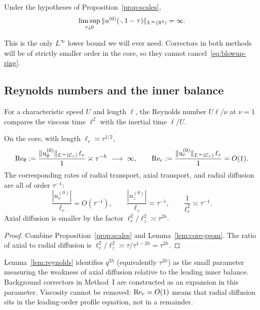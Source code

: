 \begin{corollary}
\label{cor:leading-blowup}
Under the hypotheses of Proposition~\ref{prop:scales},
\[
\limsup_{\tau\downarrow 0}\|u^{(0)}(\cdot,1-\tau)\|_{L^\infty(\mathbb{R}^3)}=\infty.
\]
\end{corollary}

This is the only $L^\infty$ lower bound we will ever need. Correctors in both methods will be of strictly smaller order in the core, so they cannot cancel~\eqref{eq:blowup-ring}.

\subsection{Reynolds numbers and the inner balance}
\label{sec:reynolds}

For a characteristic speed $U$ and length $\ell$, the {R}eynolds number $U\ell/\nu$ at $\nu=1$ compares the viscous time $\ell^2$ with the inertial time $\ell/U$.

\begin{lemma}
\label{lem:reynolds}
On the core, with length $\ell_r\asymp\tau^{1/2}$,
\begin{equation}
\label{eq:Re}
\mathrm{Re}_\theta
:=\frac{\|u^{(0)}_\theta\|_{L^\infty(\mathcal C_\tau)}\,\ell_r}{1}
\asymp \tau^{-h}\ \longrightarrow\ \infty,
\qquad
\mathrm{Re}_r
:=\frac{\|u^{(0)}_r\|_{L^\infty(\mathcal C_\tau)}\,\ell_r}{1}
=O(1).
\end{equation}
The corresponding rates of radial transport, axial transport, and radial diffusion are all of order $\tau^{-1}$:
\begin{equation}
\label{eq:rates}
\frac{|u^{(0)}_r|}{\ell_r}=O(\tau^{-1}),
\qquad
\frac{|u^{(0)}_z|}{\ell_z}\asymp\tau^{-1},
\qquad
\frac{1}{\ell_r^2}\asymp\tau^{-1}.
\end{equation}
Axial diffusion is smaller by the factor $\ell_r^2/\ell_z^2\asymp\tau^{2h}$.
\end{lemma}

\begin{proof}
Combine Proposition~\ref{prop:scales} and Lemma~\ref{lem:core-geom}. The ratio of axial to radial diffusion is $\ell_r^2/\ell_z^2\asymp \tau/\tau^{1-2h}=\tau^{2h}$.
\end{proof}

\begin{remark}
\label{rem:q2h}
Lemma~\ref{lem:reynolds} identifies $q^{2h}$ (equivalently $\tau^{2h}$) as the small parameter measuring the weakness of axial diffusion relative to the leading inner balance. Background correctors in Method~I are constructed as an expansion in this parameter. Viscosity cannot be removed: $\mathrm{Re}_r=O(1)$ means that radial diffusion sits in the leading-order profile equation, not in a remainder.
\end{remark}

